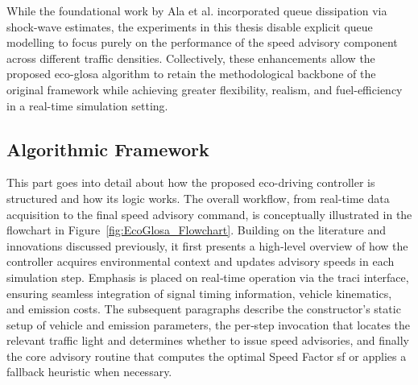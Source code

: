 While the foundational work by Ala et al. \cite{Ala2016} incorporated queue dissipation via shock-wave estimates, the experiments in this thesis disable explicit queue modelling to focus purely on the performance of the speed advisory component across different traffic densities. Collectively, these enhancements allow the proposed \ac{eco-glosa} algorithm to retain the methodological backbone of the original framework while achieving greater flexibility, realism, and fuel-efficiency in a real-time simulation setting.

\subsection{Algorithmic Framework}
\label{sec:EcoGlosa_Framework}

This part goes into detail about how the proposed eco-driving controller is structured and how its logic works. The overall workflow, from real-time data acquisition to the final speed advisory command, is conceptually illustrated in the flowchart in Figure~\vref{fig:EcoGlosa_Flowchart}. Building on the literature and innovations discussed previously, it first presents a high‐level overview of how the controller acquires environmental context and updates advisory speeds in each simulation step. Emphasis is placed on real‐time operation via the \ac{traci} interface, ensuring seamless integration of signal timing information, vehicle kinematics, and emission costs. The subsequent paragraphs describe the constructor’s static setup of vehicle and emission parameters, the per‐step invocation that locates the relevant traffic light and determines whether to issue speed advisories, and finally the core advisory routine that computes the optimal Speed Factor \gls{sf} or applies a fallback heuristic when necessary.

